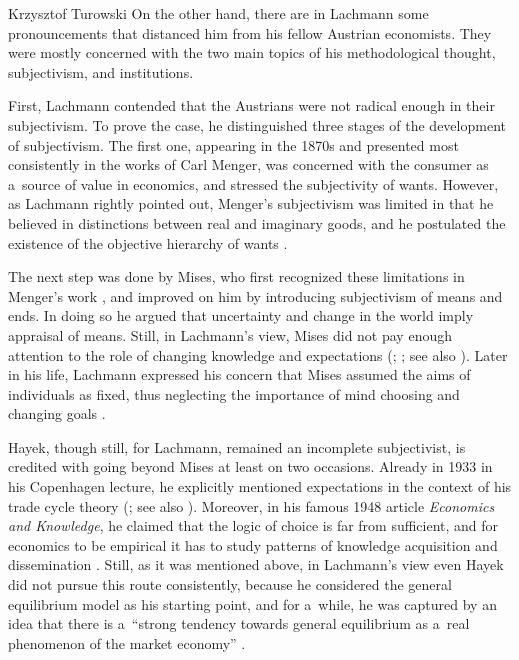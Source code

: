 \begin{artengenv}{Krzysztof Turowski}
On the other hand, there are in Lachmann some pronouncements that distanced him from his fellow Austrian economists. They were mostly concerned with the two main topics of his methodological thought, subjectivism, and institutions.

First, Lachmann contended that the Austrians were not radical enough in their subjectivism.
To prove the case, he distinguished three stages of the development of subjectivism. The first one, appearing in the 1870s and presented most consistently in the works of Carl Menger, was concerned with the consumer as a~source of value in economics, and stressed the subjectivity of wants.
However, as Lachmann rightly pointed out, Menger's subjectivism was limited in that he believed in distinctions between real and imaginary goods, and he postulated the existence of the objective hierarchy of wants \parencite[57]{lachmann-menger}.

The next step was done by Mises, who first recognized these limitations in Menger's work \parencite[192]{mises-epe}, and improved on him by introducing subjectivism of means and ends. In doing so he argued that uncertainty and change in the world imply appraisal of means. Still, in Lachmann's view, Mises did not pay enough attention to the role of changing knowledge and expectations (\cite[57]{lachmann-expectations}; \citeyear[37]{lachmann-extension}; see also \cite[65--66]{koppl}). Later in his life, Lachmann expressed his concern that Mises assumed the aims of individuals as fixed, thus neglecting the importance of mind choosing and changing goals \parencite[6]{lachmann-shackle-place}.

Hayek, though still, for Lachmann, remained an incomplete subjectivist, is credited with going beyond Mises at least on two occasions.
Already in 1933 in his Copenhagen lecture, he explicitly mentioned expectations in the context of his trade cycle theory (\cite{hayek-1933}; see also \cite[259]{lachmann-hicks-neo}). Moreover, in his famous 1948 article \emph{Economics and Knowledge}, he claimed that the logic of choice is far from sufficient, and for economics to be empirical it has to study patterns of knowledge acquisition and dissemination \parencite[33]{hayek-knowledge}.
Still, as it was mentioned above, in Lachmann's view even Hayek did not pursue this route consistently, because he considered the general equilibrium model as his starting point, and for a~while, he was captured by an idea that there is a~``strong tendency towards general equilibrium as a~real phenomenon of the market economy'' \parencite[60]{lachmann-kaleidic}.


\end{artengenv}
